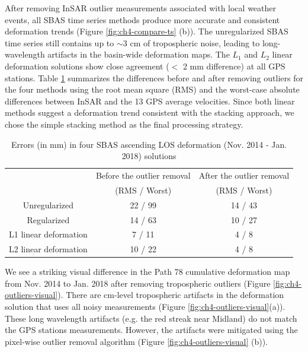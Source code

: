 After removing InSAR outlier measurements associated with local weather events, all SBAS time series methods produce more accurate and consistent deformation trends (Figure \ref{fig:ch4-compare-ts} (b)). The unregularized SBAS time series still contains up to $\sim$3 cm of tropospheric noise, leading to long-wavelength artifacts in the basin-wide deformation maps. The $ L_1 $ and $ L_2 $ linear deformation solutions show close agreement ($<$ 2 mm difference) at all GPS stations. 
Table \ref{tab:compare-errors} summarizes the differences before and after removing outliers for the four methods using the root mean square (RMS) and the worst-case absolute differences between InSAR and the 13 GPS average velocities.
Since both linear methods suggest a deformation trend consistent with the stacking approach, we chose the simple stacking method as the final processing strategy.

\begin{table}
	\caption{Errors (in mm) in four SBAS ascending LOS deformation (Nov. 2014 - Jan. 2018) solutions}
	\centering
	\begin{tabular}{|c|c|c|}
		\hline 
		& Before the outlier removal & After the outlier removal \\
		& (RMS / Worst) & (RMS / Worst) \\
		\hline
		Unregularized &  22 / 99     &  14 / 43         \\\hline
		Regularized   &    14 / 63   &   10  / 27       \\\hline
		L1 linear deformation          &   7 / 11      & 4 / 8      \\\hline
		L2 linear deformation          &   10 / 22        & 4 / 8      \\\hline
	\end{tabular}
	\label{tab:compare-errors}
\end{table}

We see a striking visual difference in the Path 78 cumulative deformation map from Nov. 2014 to Jan. 2018 after removing tropospheric outliers (Figure \ref{fig:ch4-outliers-visual}).
There are cm-level tropospheric artifacts in the deformation solution that uses all noisy measurements (Figure \ref{fig:ch4-outliers-visual}(a)).
These long wavelength artifacts (e.g. the red streak near Midland) do not match the GPS stations measurements.
However, the artifacts were mitigated using the pixel-wise outlier removal algorithm (Figure \ref{fig:ch4-outliers-visual} (b)). 

